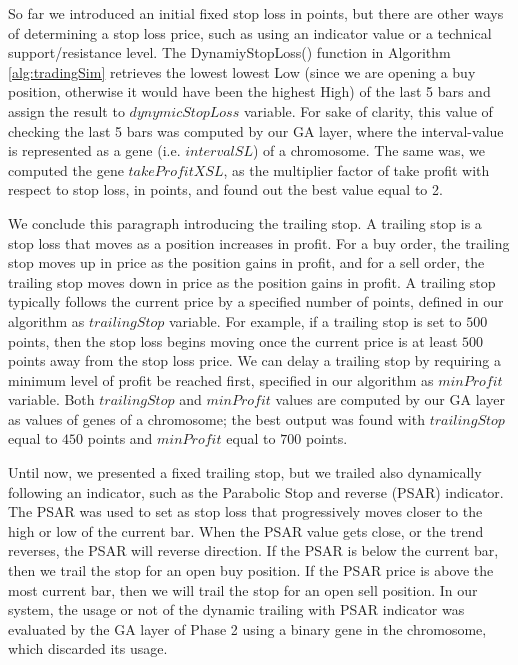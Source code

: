 So far we introduced an initial fixed stop loss in points, but there are other ways of determining a stop loss price, such as using an indicator value or a technical support/resistance level. The DynamiyStopLoss() function in Algorithm \ref{alg:tradingSim} retrieves the lowest lowest Low (since we are opening a buy position, otherwise it would have been the highest High) of the last 5 bars and assign the result to $dynymicStopLoss$ variable. For sake of clarity, this value of checking the last 5 bars was computed by our GA layer, where the interval-value is represented as a gene (i.e. $intervalSL$) of a chromosome. The same was, we computed the gene $takeProfitXSL$, as the multiplier factor of take profit with respect to stop loss, in points, and found out the best value equal to 2.

We conclude this paragraph introducing the trailing stop. A trailing stop is a stop loss that moves as a position increases in profit. For a buy order, the trailing stop moves up in price as the position gains in profit, and for a sell order, the trailing stop moves down in price as the position gains in profit. A trailing stop typically follows the current price by a specified number of points, defined in our algorithm as $trailingStop$ variable. For example, if a trailing stop is set to $500$ points, then the stop loss begins moving once the current price is at least $500$ points away from the stop loss price. We can delay a trailing stop by requiring a minimum level of profit be reached first, specified in our algorithm as $minProfit$ variable. Both $trailingStop$ and $minProfit$ values are computed by our GA layer as values of genes of a chromosome; the best output was found with $trailingStop$ equal to $450$ points and $minProfit$ equal to $700$ points. 

Until now, we presented a fixed trailing stop, but we trailed also dynamically following an indicator, such as the Parabolic Stop and reverse (PSAR) indicator. The PSAR was used to set as stop loss that progressively moves closer to the high or low of the current bar. When the PSAR value gets close, or the trend reverses, the PSAR will reverse direction. If the PSAR is below the current bar, then we trail the stop for an open buy position. If the PSAR price is above the most current bar, then we will trail the stop for an open sell position. In our system, the usage or not of the dynamic trailing with PSAR indicator was evaluated by the GA layer of Phase 2 using a binary gene in the chromosome, which discarded its usage.

